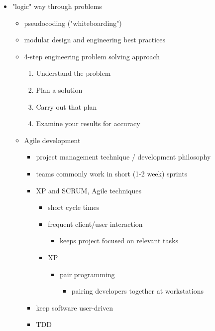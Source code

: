 \documentclass[11pt]{article}
\begin{document}
\begin{itemize}
\item "logic" way through problems
\begin{itemize}
\item pseudocoding ("whiteboarding")
\item modular design and engineering best practices
\item 4-step engineering problem solving approach
\begin{enumerate}
\item Understand the problem
\item Plan a solution
\item Carry out that plan
\item Examine your results for accuracy
\end{enumerate}
\item Agile development
\begin{itemize}
\item project management technique / development philosophy
\item teams commonly work in short (1-2 week) sprints
\item XP and SCRUM, Agile techniques
\begin{itemize}
\item short cycle times
\item frequent client/user interaction
\begin{itemize}
\item keeps project focused on relevant tasks
\end{itemize}
\item XP
\begin{itemize}
\item pair programming
\begin{itemize}
\item pairing developers together at workstations
\end{itemize}
\end{itemize}
\end{itemize}
\item keep software user-driven
\item TDD
\end{itemize}
\end{itemize}
\end{itemize}
\end{document}
